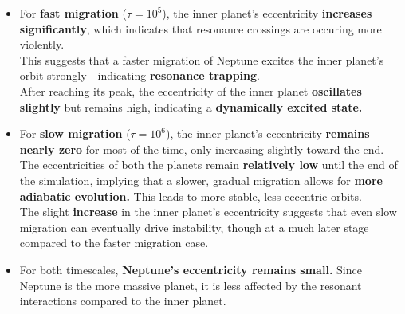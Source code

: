 \documentclass[12pt,a4paper]{article}
\begin{document}
\begin{itemize}
    \item For \textbf{fast migration} (\(\tau = 10^5\)), the inner planet’s eccentricity \textbf{increases significantly}, which indicates that resonance crossings are occuring more violently. 
    \\ This suggests that a faster migration of Neptune excites the inner planet's orbit strongly - indicating \textbf{resonance trapping}.
    \\ After reaching its peak, the eccentricity of the inner planet \textbf{oscillates slightly} but remains high, indicating a \textbf{dynamically excited state.}
    \item For \textbf{slow migration} (\(\tau = 10^6\)), the inner planet’s eccentricity \textbf{remains nearly zero} for most of the time, only increasing slightly toward the end.
    \\ The eccentricities of both the planets remain \textbf{relatively low} until the end of the simulation, implying that a slower, gradual migration allows for \textbf{more adiabatic evolution.} This leads to more stable, less eccentric orbits.
    \\ The slight \textbf{increase} in the inner planet's eccentricity suggests that even slow migration can eventually drive instability, though at a much later stage compared to the faster migration case.
    \item For both timescales, \textbf{Neptune's eccentricity remains small.} Since Neptune is the more massive planet, it is less affected by the resonant interactions compared to the inner planet.
    
  \end{itemize}
\end{document}

